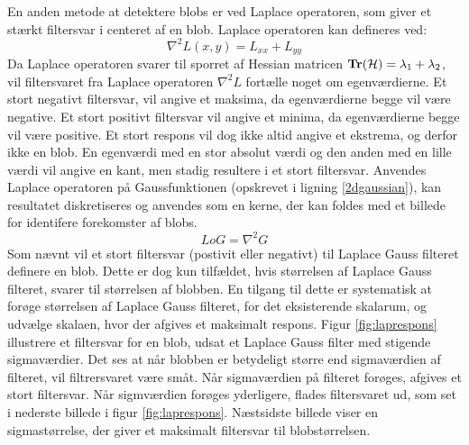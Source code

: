       \vspace{-2.7em}
\noindent
En anden metode at detektere blobs er ved Laplace operatoren, som giver et stærkt filtersvar i centeret af en blob. Laplace operatoren kan defineres ved:
\begin{equation}
\nabla^2L(x,y) = L_{xx}+L_{yy}
\end{equation}
Da Laplace operatoren svarer til sporret af Hessian matricen $\bold{Tr}(\mathcal{H}) = \lambda_1 + \lambda_2$, vil filtersvaret fra Laplace operatoren $\nabla^2L$ fortælle noget om egenværdierne. Et stort negativt filtersvar, vil angive et maksima, da egenværdierne begge vil være negative. Et stort positivt filtersvar vil angive et minima, da egenværdierne begge vil være positive. Et stort respons vil dog ikke altid angive et ekstrema, og derfor ikke en blob. En egenværdi med en stor absolut værdi og den anden med en lille værdi vil angive en kant, men stadig resultere i et stort filtersvar.
\label{laplaceblob}
Anvendes Laplace operatoren på Gaussfunktionen (opskrevet i ligning \eqref{2dgaussian}), kan resultatet diskretiseres og anvendes som en kerne, der kan foldes med et billede for identifere forekomster af blobs.
\begin{equation}
LoG= \nabla^2 G
\label{lap}
\end{equation}
Som nævnt vil et stort filtersvar (postivit eller negativt) til Laplace Gauss filteret definere en blob. Dette er dog kun tilfældet, hvis størrelsen af Laplace Gauss filteret, svarer til størrelsen af blobben. En tilgang til dette er systematisk at forøge størrelsen af Laplace Gauss filteret, for det eksisterende skalarum, og udvælge skalaen, hvor der afgives et maksimalt respons. Figur \ref{fig:laprespons} illustrere et filtersvar for en blob, udsat et Laplace Gauss filter med stigende sigmaværdier. Det ses at når blobben er betydeligt større end sigmaværdien af filteret, vil filtrersvaret være småt. Når sigmaværdien på filteret forøges, afgives et stort filtersvar. Når sigmværdien forøges yderligere, flades filtersvaret ud, som set i nederste billede i figur \ref{fig:laprespons}. Næstsidste billede viser en sigmastørrelse, der giver et maksimalt filtersvar til blobstørrelsen.
